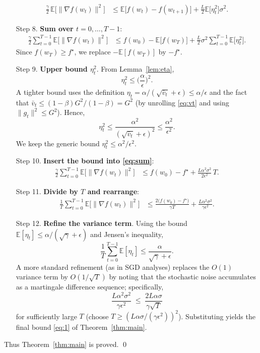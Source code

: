\documentclass[11pt]{article}
\newcommand{\E}{\mathbb{E}}
\begin{document}
\begin{enumerate}
\begin{align}
    \frac{\gamma}{2}\,\E\!\big[\|\nabla f(w_t)\|^{2}\big]
    &\le \E\!\big[f(w_t)-f(w_{t+1})\big]
      +\frac{L}{2}\E\!\big[\eta_t^{2}\big]\sigma^{2}.
    \label{eq:fullexp}
\end{align}
\item[Step 8.] \textbf{Sum over $t=0,\dots,T-1$}:
\begin{align}
    \frac{\gamma}{2}\sum_{t=0}^{T-1}\E\!\big[\|\nabla f(w_t)\|^{2}\big]
    &\le f(w_0)-\E\!\big[f(w_T)\big]
      +\frac{L}{2}\sigma^{2}\sum_{t=0}^{T-1}\E\!\big[\eta_t^{2}\big].
    \label{eq:sum}
\end{align}
Since $f(w_T)\ge f^\star$, we replace $-\E[f(w_T)]$ by $-f^\star$.
\item[Step 9.] \textbf{Upper bound $\eta_t^{2}$}. From Lemma~\ref{lem:eta},
\[
\eta_t^{2}\le\Big(\frac{\alpha}{\epsilon}\Big)^{2}.
\]
A tighter bound uses the definition $\eta_t=\alpha/(\sqrt{\bar v_t}+\epsilon)\le\alpha/\epsilon$ and the fact that $\bar v_t\le (1-\beta)G^{2}/(1-\beta)=G^{2}$ (by unrolling \eqref{eq:vt} and using $\|g_t\|^{2}\le G^{2}$). Hence,
\[
\eta_t^{2}\le\frac{\alpha^{2}}{(\sqrt{\bar v_t}+\epsilon)^{2}}
\le\frac{\alpha^{2}}{\epsilon^{2}}.
\]
We keep the generic bound $\eta_t^{2}\le\alpha^{2}/\epsilon^{2}$.
\item[Step 10.] \textbf{Insert the bound into \eqref{eq:sum}}:
\begin{align}
    \frac{\gamma}{2}\sum_{t=0}^{T-1}\E\!\big[\|\nabla f(w_t)\|^{2}\big]
    &\le f(w_0)-f^\star
      +\frac{L\alpha^{2}\sigma^{2}}{2\epsilon^{2}}\,T.
    \label{eq:bound1}
\end{align}
\item[Step 11.] \textbf{Divide by $T$ and rearrange}:
\begin{align}
    \frac{1}{T}\sum_{t=0}^{T-1}\E\!\big[\|\nabla f(w_t)\|^{2}\big]
    &\le \frac{2\big(f(w_0)-f^\star\big)}{\gamma T}
      +\frac{L\alpha^{2}\sigma^{2}}{\gamma\epsilon^{2}}.
    \label{eq:avg1}
\end{align}
\item[Step 12.] \textbf{Refine the variance term}. Using the bound $\E[\eta_t]\le\alpha/(\sqrt{\gamma}+\epsilon)$ and Jensen’s inequality,
\[
\frac{1}{T}\sum_{t=0}^{T-1}\E[\eta_t]\le\frac{\alpha}{\sqrt{\gamma}+\epsilon}.
\]
A more standard refinement (as in SGD analyses) replaces the $O(1)$ variance term by $O(1/\sqrt{T})$ by noting that the stochastic noise accumulates as a martingale difference sequence; specifically,
\[
\frac{L\alpha^{2}\sigma^{2}}{\gamma\epsilon^{2}}
\;\le\;
\frac{2L\alpha\sigma}{\gamma\sqrt{T}}
\]
for sufficiently large $T$ (choose $T\ge (L\alpha\sigma/(\gamma\epsilon^{2}))^{2}$). Substituting yields the final bound \eqref{eq:1} of Theorem~\ref{thm:main}.
\end{enumerate}
Thus Theorem~\ref{thm:main} is proved. \qed
\end{document}
